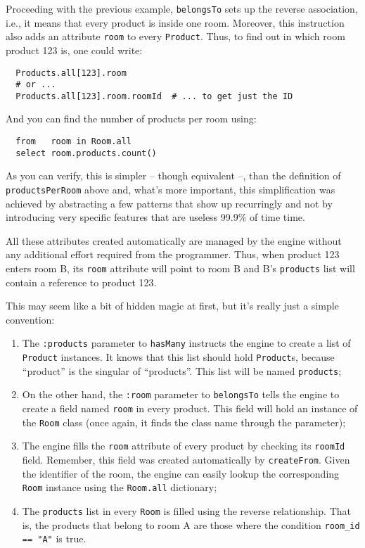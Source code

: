 \documentclass[a4,11pt]{report}
\begin{document}
Proceeding with the previous example, \verb=belongsTo= sets up the
reverse association, i.e., it means that every product is inside one
room. Moreover, this instruction also adds an attribute \verb=room= to
every \verb=Product=. Thus, to find out in which room product 123 is,
one could write:

\begin{lstlisting}
  Products.all[123].room
  # or ...
  Products.all[123].room.roomId  # ... to get just the ID
\end{lstlisting}

And you can find the number of products per room using:

\begin{lstlisting}
  from   room in Room.all
  select room.products.count()
\end{lstlisting}

As you can verify, this is simpler -- though equivalent --, than the
definition of \verb=productsPerRoom= above and, what's more important,
this simplification was achieved by abstracting a few patterns that
show up recurringly and not by introducing very specific features that
are useless 99.9\% of time time.

All these attributes created automatically are managed by the engine
without any additional effort required from the programmer. Thus, when
product 123 enters room B, its \verb=room= attribute will point to
room B and B's \verb=products= list will contain a reference to
product 123.

This may seem like a bit of hidden magic at first, but it's really
just a simple convention:

\begin{enumerate}
\item The \verb=:products= parameter to \verb=hasMany= instructs the
  engine to create a list of \verb=Product= instances. It knows that
  this list should hold \verb=Product=s, because ``product'' is the
  singular of ``products''. This list will be named \verb=products=;
\item On the other hand, the \verb=:room= parameter to
  \verb=belongsTo= tells the engine to create a field named
  \verb=room= in every product. This field will hold an instance of
  the \verb=Room= class (once again, it finds the class name through
  the parameter);
\item The engine fills the \verb=room= attribute of every product by
  checking its \verb=roomId= field. Remember, this field was created
  automatically by \verb=createFrom=. Given the identifier of the
  room, the engine can easily lookup the corresponding \verb=Room=
  instance using the \verb=Room.all= dictionary;
\item The \verb=products= list in every \verb=Room= is filled using
  the reverse relationship. That is, the products that belong to room
  A are those where the condition \verb!room_id == "A"! is true.
\end{enumerate}
\end{document}
